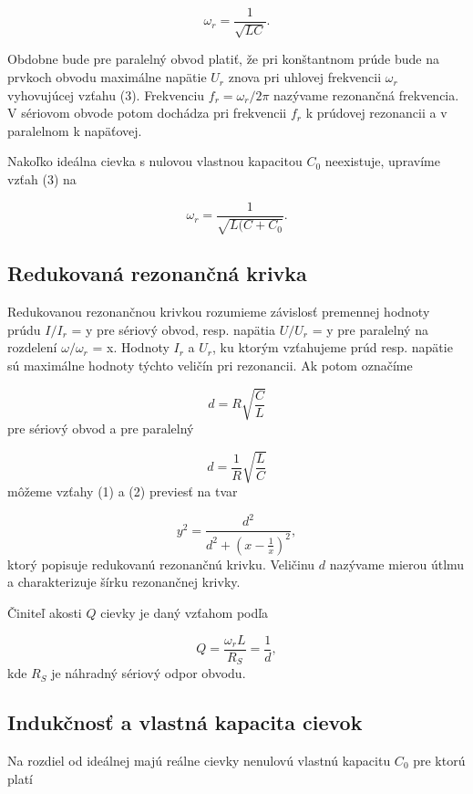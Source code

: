 \documentclass{article}
\begin{document}
\begin{equation}
    {\omega}_r = \frac{1}{\sqrt{LC}}. 
\end{equation}

Obdobne bude pre paralelný obvod platiť, že pri konštantnom prúde bude na prvkoch obvodu maximálne napätie $U_r$ znova pri uhlovej frekvencii ${\omega}_r$ vyhovujúcej vzťahu (3). Frekvenciu $f_r = {\omega}_r/2\pi$ nazývame rezonančná frekvencia. V sériovom obvode potom dochádza pri frekvencii $f_r$ k prúdovej rezonancii a v paralelnom k napäťovej.

Nakoľko ideálna cievka s nulovou vlastnou kapacitou $C_0$ neexistuje, upravíme vzťah (3) na 

\begin{equation}
    {\omega}_r = \frac{1}{\sqrt{L(C+C_0}}.
\end{equation}
\subsection{Redukovaná rezonančná krivka}
Redukovanou rezonančnou krivkou rozumieme závislosť premennej hodnoty prúdu $I/I_r$ = y pre sériový obvod, resp. napätia $U/U_r$ = y pre paralelný na rozdelení ${\omega}/{\omega}_r$ = x. Hodnoty $I_r$ a $U_r$, ku ktorým vzťahujeme prúd resp. napätie sú maximálne hodnoty týchto veličín pri rezonancii. Ak potom označíme 

\begin{equation}
    d = R\sqrt{\frac{C}{L}}
\end{equation}
pre sériový obvod a pre paralelný 

\begin{equation}
    d = \frac{1}{R}\sqrt{\frac{L}{C}}
\end{equation}
môžeme vzťahy (1) a (2) previesť na tvar 

\begin{equation}
    y^2 = \frac{d^2}{d^2 + \left(x-\frac{1}{x}\right)^2},
\end{equation}
ktorý popisuje redukovanú rezonančnú krivku. Veličinu $d$ nazývame mierou útlmu a charakterizuje šírku rezonančnej krivky. 

Činiteľ akosti $Q$ cievky je daný vzťahom podľa \cite{2}

\begin{equation}
    Q = \frac{{\omega}_rL}{R_S} = \frac{1}{d},
\end{equation}
kde $R_S$ je náhradný sériový odpor obvodu. 

\subsection{Indukčnosť a vlastná kapacita cievok}
Na rozdiel od ideálnej majú reálne cievky nenulovú vlastnú kapacitu $C_0$ pre ktorú platí \cite{2}
\end{document}
